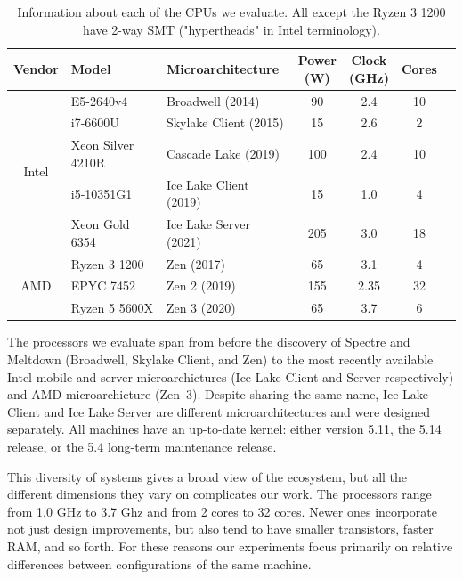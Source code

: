 \begin{table}[t]
    \begin{center}
    \begin{tabular}{ cllcccc }
      \textbf{Vendor} & \textbf{Model} & \textbf{Microarchitecture} & \shortstack{\textbf{Power} \\ \textbf{(W)}} & \shortstack{\textbf{Clock} \\ \textbf{(GHz)}} & \textbf{Cores} \\ \hline 
        \multirow{5}{*}{Intel} & E5-2640v4         & Broadwell (2014)          & 90 & 2.4 & 10 \\
                               & i7-6600U          & Skylake Client (2015)   & 15 & 2.6 & 2 \\
                               & Xeon Silver 4210R & Cascade Lake (2019)       & 100 & 2.4 & 10 \\
                               & i5-10351G1        & Ice Lake Client (2019)  & 15 & 1.0 & 4 \\
                               & Xeon Gold 6354    & Ice Lake Server (2021)  & 205 & 3.0 & 18 \\ \hline
        \multirow{3}{*}{AMD}   & Ryzen 3 1200      & Zen (2017)                & 65 & 3.1 & 4 \\
                               & EPYC 7452         & Zen 2 (2019)              & 155 & 2.35 & 32 \\
                               & Ryzen 5 5600X     & Zen 3 (2020)              & 65 & 3.7 & 6 \\ \hline
    \end{tabular}
    \end{center}
    \caption{Information about each of the CPUs we evaluate. All except the Ryzen 3 1200 have 2-way SMT ("hypertheads" in Intel terminology).}
    \label{fig:cpus}
  \end{table}

The processors we evaluate span from before the discovery of Spectre and Meltdown (Broadwell, Skylake Client, and Zen) to the most recently available Intel mobile and server microarchictures (Ice Lake Client and Server respectively) and AMD microarchicture (Zen~3).
Despite sharing the same name, Ice Lake Client and Ice Lake Server are different microarchitectures and were designed separately.
All machines have an up-to-date kernel: either version 5.11, the 5.14 release, or the 5.4 long-term maintenance release.

This diversity of systems gives a broad view of the ecosystem, but all the different dimensions they vary on complicates our work.
The processors range from 1.0 GHz to 3.7 Ghz and from 2 cores to 32 cores.
Newer ones incorporate not just design improvements, but also tend to have smaller transistors, faster RAM, and so forth.
For these reasons our experiments focus primarily on relative differences between configurations of the same machine.

